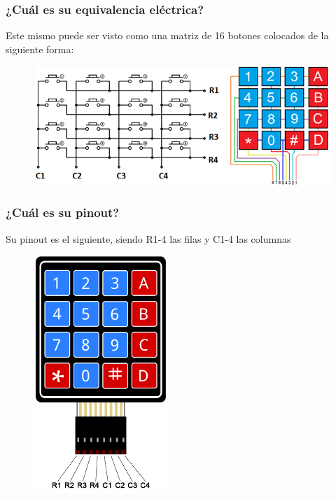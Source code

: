 \documentclass{article}
\begin{document}
		\clearpage

		\subsubsection{¿Cuál es su equivalencia eléctrica?}
		Este mismo puede ser visto como una matriz de 16 botones colocados de la siguiente
		forma:
		\begin{figure}[H]
			\centering
			\includegraphics[width=\textwidth]{keypad_equivalencia.png}
		\end{figure}

		\subsubsection{¿Cuál es su pinout?}
		Su pinout es el siguiente, siendo R1-4 las filas y C1-4 las columnas
		\begin{figure}[H]
			\centering
			\includegraphics[width=0.45\textwidth]{keypad_pinout.png}
		\end{figure}
\end{document}
